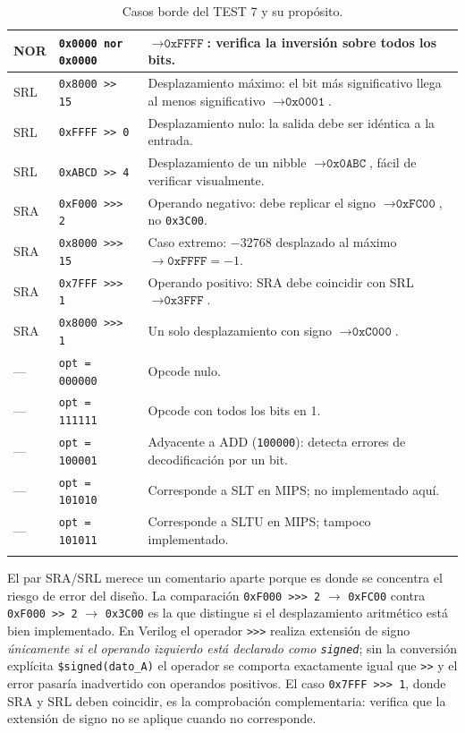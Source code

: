 \documentclass[12pt,a4paper]{article}
\begin{document}
\begin{longtable}{llp{7.4cm}}
  NOR & \texttt{0x0000 nor 0x0000} & $\to \texttt{0xFFFF}$: verifica la inversión sobre todos los bits. \\
  \midrule
  SRL & \texttt{0x8000 >> 15} & Desplazamiento máximo: el bit más significativo llega al menos significativo $\to \texttt{0x0001}$. \\
  SRL & \texttt{0xFFFF >> 0}   & Desplazamiento nulo: la salida debe ser idéntica a la entrada. \\
  SRL & \texttt{0xABCD >> 4}   & Desplazamiento de un nibble $\to \texttt{0x0ABC}$, fácil de verificar visualmente. \\
  \midrule
  SRA & \texttt{0xF000 >>> 2}  & Operando negativo: debe replicar el signo $\to \texttt{0xFC00}$, no \texttt{0x3C00}. \\
  SRA & \texttt{0x8000 >>> 15} & Caso extremo: $-32768$ desplazado al máximo $\to \texttt{0xFFFF} = -1$. \\
  SRA & \texttt{0x7FFF >>> 1}  & Operando positivo: SRA debe coincidir con SRL $\to \texttt{0x3FFF}$. \\
  SRA & \texttt{0x8000 >>> 1}  & Un solo desplazamiento con signo $\to \texttt{0xC000}$. \\
  \midrule
  --- & \texttt{opt = 000000} & Opcode nulo. \\
  --- & \texttt{opt = 111111} & Opcode con todos los bits en 1. \\
  --- & \texttt{opt = 100001} & Adyacente a ADD (\texttt{100000}): detecta errores de decodificación por un bit. \\
  --- & \texttt{opt = 101010} & Corresponde a SLT en MIPS; no implementado aquí. \\
  --- & \texttt{opt = 101011} & Corresponde a SLTU en MIPS; tampoco implementado. \\
  \bottomrule
  \caption{Casos borde del TEST 7 y su propósito.}
  \label{tab:borde}
\end{longtable}

El par SRA/SRL merece un comentario aparte porque es donde se concentra el
riesgo de error del diseño. La comparación \texttt{0xF000 >>> 2} $\to$
\texttt{0xFC00} contra \texttt{0xF000 >> 2} $\to$ \texttt{0x3C00} es la que
distingue si el desplazamiento aritmético está bien implementado. En Verilog el
operador \texttt{>>>} realiza extensión de signo \emph{únicamente si el operando
izquierdo está declarado como \texttt{signed}}; sin la conversión explícita
\texttt{\$signed(dato\_A)} el operador se comporta exactamente igual que
\texttt{>>} y el error pasaría inadvertido con operandos positivos. El caso
\texttt{0x7FFF >>> 1}, donde SRA y SRL deben coincidir, es la comprobación
complementaria: verifica que la extensión de signo no se aplique cuando no
corresponde.
\end{document}
